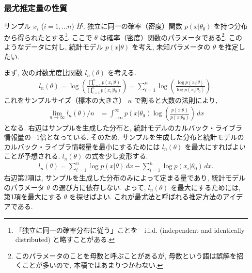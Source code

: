 \documentclass{jarticle}
\begin{document}
\subsubsection{最尤推定量の性質}
サンプル $x_i$ ($i=1,\ldots n$) が, 独立に同一の確率（密度）関数 $p(x|\theta_0)$ を持つ分布から得られたとする\footnote{ 「独立に同一の確率分布に従う」ことを　i.i.d. (independent and identically distributed) と略すことがある.}. ここで $\theta$ は確率（密度）関数のパラメータである\footnote{このパラメータのことを母数と呼ぶことがあるが, 母数という語は誤解を招くことが多いので, 本稿ではあまりつかわない.}.  
このようなデータに対し, 統計モデル $p(x|\theta)$ を考え, 未知パラメータの $\theta$ を推定したい.

まず, 次の対数尤度比関数 $l_n(\theta)$ を考える. 
\begin{align}
l_n(\theta) = \log \left( \frac{\prod_{i=1}^{n}p(x_i|\theta)}{\prod_{i=1}^{n}p(x_i|\theta_0)} \right) = \sum_{i=1}^{n}\log \left(\frac{\log p(x_i| \theta)}{\log p(x_i| \theta_0)}\right).
\end{align}
これをサンプルサイズ（標本の大きさ） $n$ で割ると大数の法則により, 
\begin{align}
\lim_{n\to \infty} l_n(\theta)/n &= \int_{-\infty}^{\infty} p(x|\theta_0)\log \left(\frac{p(x| \theta)}{ p(x| \theta_0)}\right) \, dx
\end{align}
となる. 右辺はサンプルを生成した分布と, 統計モデルのカルバック・ライブラ情報量の$-1$倍となっている. そのため, サンプルを生成した分布と統計モデルのカルバック・ライブラ情報量を最小にするためには $l_n(\theta)$ を最大にすればよいことが予想される.
$l_n(\theta)$ の式を少し変形する. 
\begin{align}
 l_n(\theta)= \sum_{i=1}^{n}\log p(x| \theta) \, dx -  \sum_{i=1}^{n}\log p(x_i| \theta_0)\, dx.
 \label{eqln}
\end{align}
右辺第2項は, サンプルを生成した分布のみによって定まる量であり, 統計モデルのパラメータ $\theta$ の選び方に依存しない. 
よって, $l_n(\theta)$ を最大にするためには, 第1項を最大にする $\theta$ を探せばよい. これが最尤法と呼ばれる推定方法のアイデアである.
\end{document}
